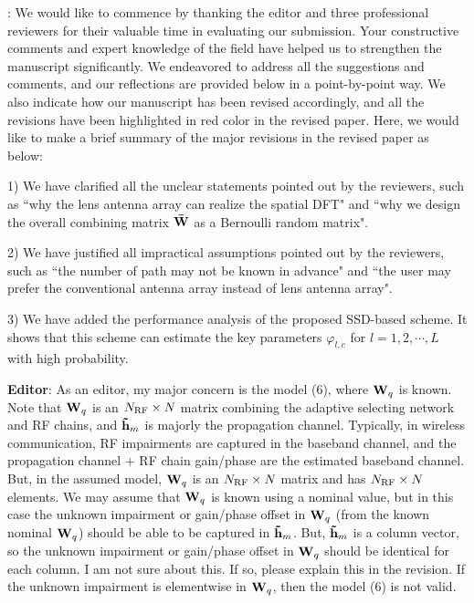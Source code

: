 \documentclass[a4paper,12pt]{article}
\begin{document}
{: We would like to commence by thanking the editor and three professional reviewers for their valuable time in evaluating our submission. Your constructive comments and expert knowledge of the field have helped us to strengthen the manuscript significantly. We endeavored to address all the suggestions and comments, and our reflections are provided below in a point-by-point way. We also indicate how our manuscript has been revised accordingly, and all the revisions have been highlighted in {\color{red} red} color in the revised paper. Here, we would like to make a brief summary of the major revisions in the revised paper as below:

1) We have clarified all the unclear statements pointed out by the reviewers, such as ``why the lens antenna array can realize the spatial DFT" and ``why we design the overall combining matrix ${{{\bf{\bar W}}}}$ as a Bernoulli random matrix".

2) We have justified all impractical assumptions pointed out by the reviewers, such as ``the number of path may not be known in advance" and ``the user may prefer the conventional antenna array instead of lens antenna array".

3) We have added the performance analysis of the proposed SSD-based scheme. It shows that this scheme can estimate the key parameters ${{\varphi _{l,c}}}$ for ${l = 1,2, \cdots ,L}$ with high probability.
}

\textbf{Editor}: As an editor, my major concern is the model (6), where ${{{\bf{W}}_q}}$ is known. Note that ${{{\bf{W}}_q}}$ is an ${{N_{{\rm{RF}}}} \times N}$ matrix combining the adaptive selecting network and RF chains,  and ${{{\bf{\tilde h}}_m}}$ is majorly the propagation channel. Typically, in wireless communication, RF impairments are captured in the baseband channel, and the propagation channel + RF chain gain/phase are the estimated baseband channel. But, in the assumed model, ${{{\bf{W}}_q}}$ is an ${{N_{{\rm{RF}}}} \times N}$ matrix and has ${{N_{{\rm{RF}}}} \times N}$ elements. We may assume that ${{{\bf{W}}_q}}$ is known using a nominal value, but in this case the unknown impairment or gain/phase offset in ${{{\bf{W}}_q}}$ (from the known nominal ${{{\bf{W}}_q}}$) should be able to be captured in ${{{\bf{\tilde h}}_m}}$. But, ${{{\bf{\tilde h}}_m}}$ is a column vector, so the unknown impairment or gain/phase offset in ${{{\bf{W}}_q}}$ should be identical for each column. I am not sure about this. If so, please explain this in the revision.  If the unknown impairment is elementwise in ${{{\bf{W}}_q}}$, then the model (6) is not valid.
\end{document}
